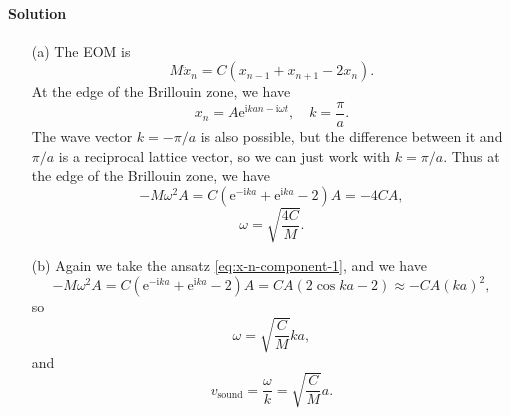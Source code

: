 \documentclass[hyperref, a4paper]{article}
\newcommand*{\ii}{\mathrm{i}}
\newcommand*{\ee}{\mathrm{e}}
\begin{document}
\paragraph{Solution} \begin{itemize}
\item[(a)] The EOM is 
\begin{equation}
    M \ddot{x}_n = C (x_{n-1} + x_{n+1} - 2 x_n).
\end{equation}
At the edge of the Brillouin zone, 
we have 
\begin{equation}
    x_n = A \ee^{\ii k a n - \ii \omega t}, \quad k = \frac{\pi}{a}.
    \label{eq:x-n-component-1}
\end{equation}
The wave vector $k = - \pi / a$ is also possible, 
but the difference between it and $\pi / a$ is a reciprocal lattice vector,
so we can just work with $k = \pi / a$.
Thus at the edge of the Brillouin zone, we have
\[
    - M \omega^2 A = C (\ee^{- \ii k a} + \ee^{\ii k a} - 2) A = - 4 C A ,
\] 
\begin{equation}
    \omega = \sqrt{\frac{4C}{M}}.
    \label{eq:single-atom-edge}
\end{equation}

\item[(b)] Again we take the ansatz \eqref{eq:x-n-component-1},
and we have 
\[
    - M \omega^2 A = C (\ee^{- \ii k a} + \ee^{\ii k a} - 2) A 
    = CA (2 \cos ka - 2) \approx - CA (ka)^2,
\]
so 
\begin{equation}
    \omega = \sqrt{\frac{C}{M}} k a,
    \label{eq:single-atom-k-0}
\end{equation}
and 
\begin{equation}
    v_{\text{sound}} = \frac{\omega}{k} = \sqrt{\frac{C}{M}} a.
    \label{eq:sound-speed}
\end{equation}


\end{itemize}
\end{document}
